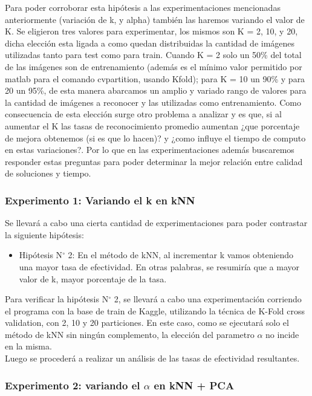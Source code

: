 Para poder corroborar esta hipótesis a las experimentaciones mencionadas anteriormente (variación de k, y alpha) también las haremos variando el valor de K. Se eligieron tres valores para experimentar, los mismos son K =  2, 10, y 20, dicha elección esta ligada a como quedan distribuidas la cantidad de imágenes utilizadas tanto para test como para train. Cuando K = 2 solo un 50\% del total de las imágenes son de entrenamiento (además es el mínimo valor permitido por matlab para el comando cvpartition, usando Kfold); para K = 10 un 90\% y para 20 un 95\%, de esta manera abarcamos un amplio y variado rango de valores para la cantidad de imágenes a reconocer y las utilizadas como entrenamiento. Como consecuencia de esta elección surge otro problema a analizar y es que, si al aumentar el K las tasas de reconocimiento promedio aumentan ¿que porcentaje de mejora obtenemos (si es que lo hacen)? y ¿como influye el tiempo de computo en estas variaciones?. Por lo que en las experimentaciones además buscaremos responder estas preguntas para poder determinar la mejor relación entre calidad de soluciones y tiempo. 


\subsubsection{Experimento 1: Variando el k en kNN}
Se llevará a cabo una cierta cantidad de experimentaciones
para poder contrastar la siguiente hipótesis:

\begin{itemize}
\item Hipótesis N$ ^{\circ} $ 2: En el método de kNN, al incrementar k vamos obteniendo una mayor tasa de efectividad. En otras palabras, se resumiría que a mayor valor de k, mayor porcentaje de la tasa.
\end{itemize}

Para verificar la hipótesis N$ ^{\circ} $ 2, se llevará a cabo una experimentación corriendo el programa con la base de train de Kaggle, utilizando la técnica de K-Fold cross validation, con 2, 10 y 20 particiones.
 En este caso, como se ejecutará solo el método de kNN sin ningún complemento, la elección del parametro $\alpha$ no incide en la misma.\\ Luego se procederá a realizar un análisis de las tasas de efectividad resultantes.

\subsubsection{Experimento 2: variando el $\alpha$ en kNN + PCA}

